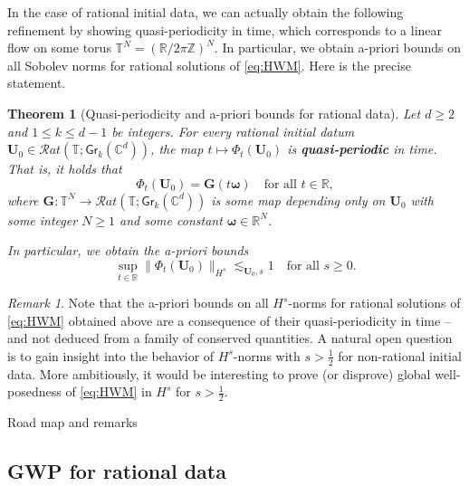 \documentclass[10pt,reqno,a4paper]{amsart}
\makeatletter
\newtheorem{thm}{Theorem}[section]
\theoremstyle{definition}
\theoremstyle{remark}
\theoremstyle{remark}
\newtheorem*{remark*}{Remark}
\numberwithin{equation}{section}
\newcommand{\C}{\mathbb{C}}
\newcommand{\Z}{\mathbb{Z}}
\newcommand{\R}{\mathbb{R}}
\newcommand{\T}{\mathbb{T}}
\newcommand{\Ub}{\mathbf{U}}
\newcommand{\Gr}{\mathsf{Gr}}
\def\section{\@startsection{section}{1}%
  \z@{1.5\linespacing\@plus\linespacing}{.5\linespacing}%
  {\normalfont\bfseries\large\centering}}
\makeatother
\begin{document}
In the case of rational initial data, we can actually obtain the following refinement by showing quasi-periodicity in time, which corresponds to a linear flow on some torus $\T^N=(\R/2\pi \Z)^N$. In particular, we obtain a-priori bounds on all Sobolev norms for rational solutions of \eqref{eq:HWM}. Here is the precise statement.

\begin{thm}[Quasi-periodicity and a-priori bounds for rational data] \label{thm:rat_qp}
Let $d \geq 2$ and $1 \leq k \leq d-1$ be integers. For every rational initial datum $\Ub_0 \in \mathcal{R}at(\T; \Gr_k(\C^d))$, the map $t \mapsto \Phi_t(\Ub_0)$ is \textbf{quasi-periodic} in time. That is, it holds that
$$
\Phi_t(\Ub_0) = \mathbf{G}( t \bm{\omega} ) \quad \mbox{for all $t \in \R$},
$$
where $\mathbf{G} : \T^N \to \mathcal{R}at(\T; \Gr_k(\C^d))$ is some map depending only on $\Ub_0$ with some integer $N \geq 1$ and some constant $\bm{\omega} \in \R^N$. 

In particular, we obtain the a-priori bounds
$$
\sup_{t \in \R} \| \Phi_t(\Ub_0) \|_{H^s} \lesssim_{\Ub_0, s} 1 \quad \mbox{for all $s \geq 0$}.
$$
\end{thm}

\begin{remark*}
Note that the a-priori bounds on all $H^s$-norms for rational solutions of \eqref{eq:HWM} obtained above are a consequence of their quasi-periodicity in time -- and not deduced from a family of conserved quantities. A natural open question is to gain insight into the behavior of $H^s$-norms with $s > \frac 1 2$ for non-rational initial data. More ambitiously, it would be interesting to prove (or disprove) global well-posedness of \eqref{eq:HWM} in $H^s$ for $s> \frac 1 2$.
\end{remark*}

\section{Road map and remarks}

\label{sec:road}

\subsection{GWP for rational data}
\end{document}
